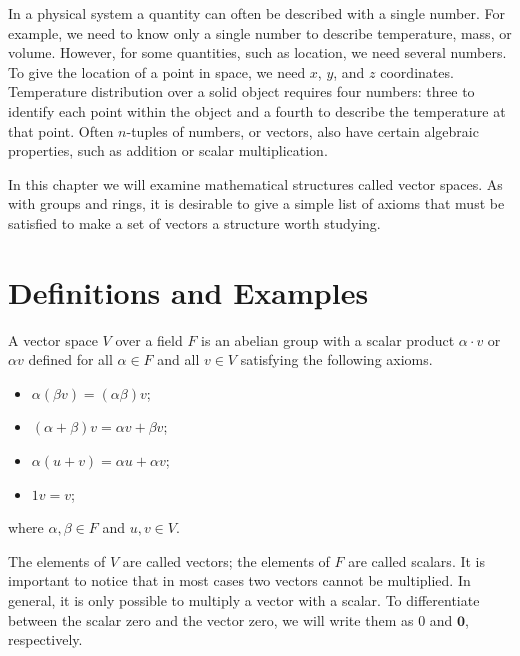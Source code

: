 

 
In a physical system a quantity can often be described with a single
number. For example, we need to know only a single number to describe
temperature, mass, or volume.  However, for some quantities, such as
location, we need several numbers. To give the location of a point in
space, we need $x$, $y$, and $z$ coordinates. Temperature
distribution over a solid object requires four numbers: three to
identify each point within the object and a fourth to describe the
temperature at that point.  Often $n$-tuples of numbers, or vectors,
also have certain algebraic properties, such as addition or scalar 
multiplication.  


In this chapter we will examine mathematical structures called vector
spaces. As with groups and rings, it is desirable to give a simple
list of axioms that must be satisfied to make a set of vectors a
structure worth studying.  
 
 
 
\section{Definitions and Examples}
 

A {\bfi vector space\/} $V$ over a
field $F$ is an abelian group with a {\bfi scalar
product\/} $\alpha \cdot v$ or $\alpha v$ defined
for all $\alpha \in F$ and all $v \in V$ satisfying the following
axioms.  
\begin{itemize}

\item 
$\alpha(\beta v) =(\alpha \beta)v$;

\item 
$(\alpha + \beta)v =\alpha v + \beta v$;

\item 
$\alpha(u + v) = \alpha u + \alpha v$;

\item 
$1v=v$;

\end{itemize}
where $\alpha, \beta \in F$ and $u, v \in V$.
 

The elements of $V$ are called {\bfi vectors}; the elements of $F$
are called {\bfi scalars}.  It is important to notice that in most
cases two vectors cannot be multiplied.  In general, it is only
possible to multiply a vector with a scalar. To differentiate between
the scalar zero and the vector zero, we will write them as 0 and
${\mathbf 0}$, respectively.  


